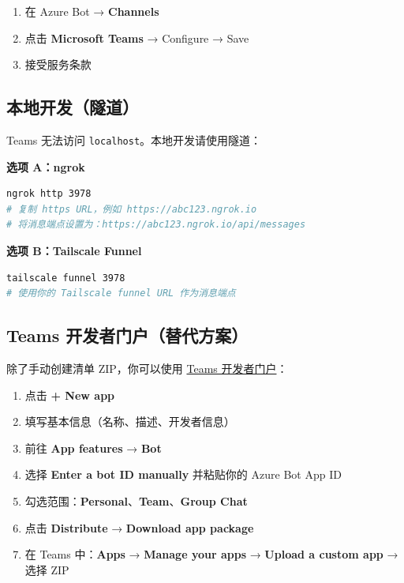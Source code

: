 \begin{enumerate}
  \item 在 Azure Bot → \textbf{Channels}
  \item 点击 \textbf{Microsoft Teams} → Configure → Save
  \item 接受服务条款
\end{enumerate}


\subsection{本地开发（隧道）}


Teams 无法访问 \texttt{localhost}。本地开发请使用隧道：

\textbf{选项 A：ngrok}

\begin{lstlisting}[language=bash]
ngrok http 3978
# 复制 https URL，例如 https://abc123.ngrok.io
# 将消息端点设置为：https://abc123.ngrok.io/api/messages
\end{lstlisting}


\textbf{选项 B：Tailscale Funnel}

\begin{lstlisting}[language=bash]
tailscale funnel 3978
# 使用你的 Tailscale funnel URL 作为消息端点
\end{lstlisting}


\subsection{Teams 开发者门户（替代方案）}


除了手动创建清单 ZIP，你可以使用 \href{https://dev.teams.microsoft.com/apps}{Teams 开发者门户}：

\begin{enumerate}
  \item 点击 \textbf{+ New app}
  \item 填写基本信息（名称、描述、开发者信息）
  \item 前往 \textbf{App features} → \textbf{Bot}
  \item 选择 \textbf{Enter a bot ID manually} 并粘贴你的 Azure Bot App ID
  \item 勾选范围：\textbf{Personal}、\textbf{Team}、\textbf{Group Chat}
  \item 点击 \textbf{Distribute} → \textbf{Download app package}
  \item 在 Teams 中：\textbf{Apps} → \textbf{Manage your apps} → \textbf{Upload a custom app} → 选择 ZIP
\end{enumerate}


